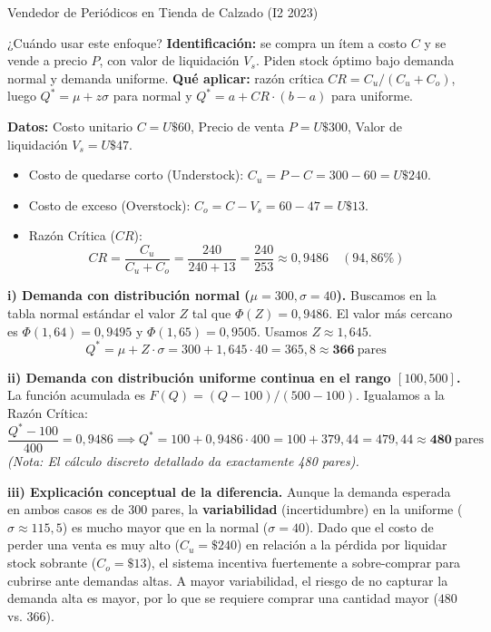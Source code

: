 \begin{ejercicio}{Vendedor de Periódicos en Tienda de Calzado (I2 2023)}

\begin{tipprueba}{¿Cuándo usar este enfoque?}
\textbf{Identificación:} se compra un ítem a costo $C$ y se vende a precio $P$, con valor de liquidación $V_s$. Piden stock óptimo bajo demanda normal y demanda uniforme. \textbf{Qué aplicar:} razón crítica $CR = C_u / (C_u + C_o)$, luego $Q^* = \mu + z \sigma$ para normal y $Q^* = a + CR \cdot (b-a)$ para uniforme.
\end{tipprueba}

\textbf{Datos:} Costo unitario $C = U\$60$, Precio de venta $P = U\$300$, Valor de liquidación $V_s = U\$47$.
\begin{itemize}[leftmargin=1.4em, itemsep=1pt]
  \item Costo de quedarse corto (Understock): $C_u = P - C = 300 - 60 = U\$240$.
  \item Costo de exceso (Overstock): $C_o = C - V_s = 60 - 47 = U\$13$.
  \item Razón Crítica ($CR$):
  \[
    CR = \frac{C_u}{C_u + C_o} = \frac{240}{240 + 13} = \frac{240}{253} \approx 0{,}9486 \quad (94{,}86\%)
  \]
\end{itemize}

\textbf{i) Demanda con distribución normal ($\mu = 300, \sigma = 40$).}
Buscamos en la tabla normal estándar el valor $Z$ tal que $\Phi(Z) = 0{,}9486$. El valor más cercano es $\Phi(1{,}64) = 0{,}9495$ y $\Phi(1{,}65) = 0{,}9505$. Usamos $Z \approx 1{,}645$.
\[
  Q^* = \mu + Z \cdot \sigma = 300 + 1{,}645 \cdot 40 = 365{,}8 \approx \mathbf{366}\ \text{pares}
\]

\textbf{ii) Demanda con distribución uniforme continua en el rango $[100, 500]$.}
La función acumulada es $F(Q) = (Q - 100)/(500 - 100)$. Igualamos a la Razón Crítica:
\[
  \frac{Q^* - 100}{400} = 0{,}9486 \implies Q^* = 100 + 0{,}9486 \cdot 400 = 100 + 379{,}44 = 479{,}44 \approx \mathbf{480}\ \text{pares}
\]
\textit{(Nota: El cálculo discreto detallado da exactamente 480 pares).}

\textbf{iii) Explicación conceptual de la diferencia.}
Aunque la demanda esperada en ambos casos es de 300 pares, la \textbf{variabilidad} (incertidumbre) en la uniforme ($\sigma \approx 115{,}5$) es mucho mayor que en la normal ($\sigma = 40$). Dado que el costo de perder una venta es muy alto ($C_u = \$240$) en relación a la pérdida por liquidar stock sobrante ($C_o = \$13$), el sistema incentiva fuertemente a sobre-comprar para cubrirse ante demandas altas. A mayor variabilidad, el riesgo de no capturar la demanda alta es mayor, por lo que se requiere comprar una cantidad mayor ($480$ vs. $366$).
\end{ejercicio}


